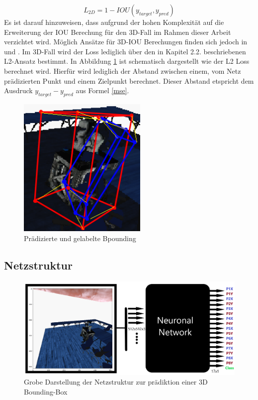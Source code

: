 \begin{equation}\label{iouloss}
	L_{2D}= 1-IOU(y_{target},y_{pred})
\end{equation} 
Es ist darauf hinzuweisen, dass aufgrund der hohen Komplexität auf die Erweiterung der IOU Berechung für den 3D-Fall im Rahmen dieser Arbeit verzichtet wird. Möglich Ansätze für 3D-IOU Berechungen finden sich jedoch in \cite{Xu2019} und \cite{Mousavian1612}. Im 3D-Fall wird der Loss lediglich über den in Kapitel 2.2. beschriebenen L2-Ansatz bestimmt. In Abbildung \ref{L2_loss_graphik} ist schematisch dargestellt wie der L2 Loss berechnet wird. Hierfür wird lediglich der Abstand zwischen einem, vom Netz prädizierten Punkt und einem Zielpunkt berechnet. Dieser Abstand etspricht dem Ausdruck $y_{target}-y_{pred}$ aus Formel \ref{mse}. 
\begin{figure}[!htb]
  \centering
  \includegraphics[width=6.2cm]{Abb/l2_loss_bei3d_bb.png}
  \caption{Prädizierte und gelabelte Bpounding}
  \label{L2_loss_graphik}
\end{figure} 
\newpage
\subsection{Netzstruktur}

\begin{figure}[!htb]
  \centering
  \includegraphics[width=13.8cm]{Abb/Modell_struktur.png}
  \caption{Grobe Darstellung der Netzstruktur zur prädiktion einer 3D Bounding-Box}
  \label{grobe_netz_struktur}
\end{figure} 

